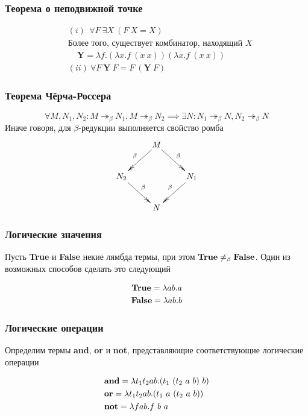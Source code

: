 \documentclass{beamer}
\newcommand{\rbm}{\twoheadrightarrow_\beta}
\newcommand{\mmterm}[1]{\text{\textbf{#1}}}
\newcommand{\mmnot}{\mmterm{not}}
\newcommand{\mmand}{\mmterm{and}}
\newcommand{\mmor}{\mmterm{or}}
\newcommand{\mmt}{\mmterm{True}}
\newcommand{\mmf}{\mmterm{False}}
\begin{document}
\begin{frame}\frametitle{Теорема о неподвижной точке}
    
\begin{align*}
	&(i)\ \ \forall F\ \exists X\ (F\ X = X) \\
	&\text{Более того, существует комбинатор, находящий $X$}\\
	&\ \ \ \ \ \boldsymbol{Y} = \lambda f.(\lambda x.f\ (x\ x)) (\lambda x.f\ (x\ x))\\
	&(ii)\ \forall F\ \boldsymbol{Y}\ F=F\ (\boldsymbol{Y}\ F)
\end{align*}

\end{frame}

\begin{frame}\frametitle{Теорема Чёрча-Россера}
    
	$$
	\forall M,N_1,N_2:M
	\rbm N_1, M
	\rbm N_2
	\implies
	\exists N : N_1
	\rbm N,N_2
	\rbm N
	$$
	Иначе говоря, для $\beta$-редукции выполняется свойство ромба
	\begin{align*}
		\xymatrix{
		& \ar@{->>}[dl]_\beta M \ar@{->>}[dr]^\beta \\
		N_2 \ar@{->>}[dr]^\beta & & N_1 \ar@{->>}[dl]_\beta \\
		&N
	}
	\end{align*}

\end{frame}

\begin{frame}\frametitle{Логические значения}
    
Пусть \textbf{True} и \textbf{False} некие лямбда термы, при этом $\mmt \neq_\beta \mmf$. Один из возможных способов сделать это следующий

\begin{align*}
\mmt = \lambda a b.a\\
\mmf = \lambda a b.b
\end{align*}

\end{frame}

\begin{frame}\frametitle{Логические операции}
    
Определим термы \textbf{and}, \textbf{or} и \textbf{not}, представляющие соответствующие логические операции

\begin{align*}
&\mmand = \lambda t_1 t_2 a b . (t_1\ (t_2\ a\ b)\ b)\\
&\mmor = \lambda t_1 t_2 a b.(t_1\ a\ (t_2\ a\ b))\\
&\mmnot = \lambda f a b . f\ b\ a
\end{align*}

\end{frame}
\end{document}
